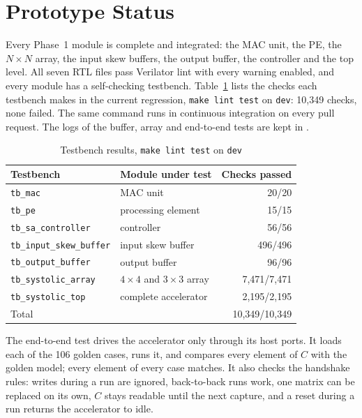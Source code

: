
\section{Prototype Status}
Every Phase~1 module is complete and integrated: the MAC unit, the PE, the $N \times N$ array, the input skew buffers, the output buffer, the controller and the top level. All seven RTL files pass Verilator lint with every warning enabled, and every module has a self-checking testbench. Table~\ref{tab:tests} lists the checks each testbench makes in the current regression, \texttt{make lint test} on \texttt{dev}: 10{,}349 checks, none failed. The same command runs in continuous integration on every pull request. The logs of the buffer, array and end-to-end tests are kept in .

\begin{table}[t]
\centering
\caption{Testbench results, \texttt{make lint test} on \texttt{dev}}
\label{tab:tests}
\footnotesize
\begin{tabular}{@{}llr@{}}
\toprule
Testbench & Module under test & Checks passed \\
\midrule
\texttt{tb\_mac} & MAC unit & 20/20 \\
\texttt{tb\_pe} & processing element & 15/15 \\
\texttt{tb\_sa\_controller} & controller & 56/56 \\
\texttt{tb\_input\_skew\_buffer} & input skew buffer & 496/496 \\
\texttt{tb\_output\_buffer} & output buffer & 96/96 \\
\texttt{tb\_systolic\_array} & $4 \times 4$ and $3 \times 3$ array & 7{,}471/7{,}471 \\
\texttt{tb\_systolic\_top} & complete accelerator & 2{,}195/2{,}195 \\
\midrule
Total & & 10{,}349/10{,}349 \\
\bottomrule
\end{tabular}
\end{table}

The end-to-end test drives the accelerator only through its host ports. It loads each of the 106 golden cases, runs it, and compares every element of $C$ with the golden model; every element of every case matches. It also checks the handshake rules: writes during a run are ignored, back-to-back runs work, one matrix can be replaced on its own, $C$ stays readable until the next capture, and a reset during a run returns the accelerator to idle.

